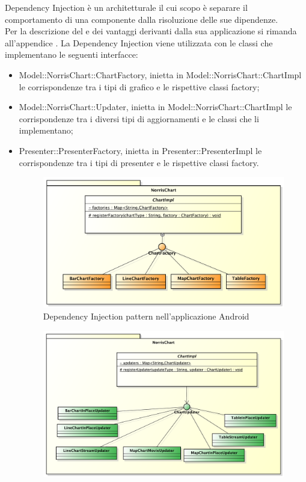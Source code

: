             Dependency Injection è un  architetturale il cui scopo è separare il comportamento di una componente dalla risoluzione delle sue dipendenze.\\
            Per la descrizione del  e dei vantaggi derivanti dalla sua applicazione si rimanda all'appendice .
                La Dependency Injection viene utilizzata con le classi che implementano le seguenti interfacce:
                \begin{itemize}
                    \item Model::NorrisChart::ChartFactory, inietta in Model::NorrisChart::ChartImpl le  corrispondenze tra i tipi di grafico e le rispettive classi factory;
                    \item Model::NorrisChart::Updater, inietta in Model::NorrisChart::ChartImpl le corrispondenze tra i diversi tipi di aggiornamenti e le classi che li implementano;
                     \item Presenter::PresenterFactory, inietta in Presenter::PresenterImpl le corrispondenze tra i tipi di presenter e le rispettive classi factory.
                    \begin{figure}[H]\centering
	        		\includegraphics[width=\textwidth]{SpecificaTecnica/Pics/DesignPatternNorris/DependencyInjection2}
	        		\caption{Dependency Injection pattern nell'applicazione Android}
	    		\end{figure}
	    		\begin{figure}[H]\centering
	        		\includegraphics[width=\textwidth]{SpecificaTecnica/Pics/DesignPatternNorris/DependencyInjection1}

\end{figure}
\end{itemize}
